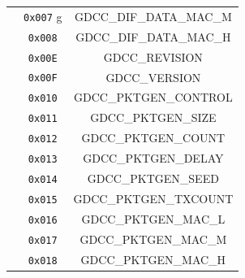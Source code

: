 \begin{table}[H]
\begin{tabular}{|c|c|c|}
                   & \texttt{0x007} g& GDCC\_DIF\_DATA\_MAC\_M \\
                   & \texttt{0x008} & GDCC\_DIF\_DATA\_MAC\_H \\
                   & \texttt{0x00E} & GDCC\_REVISION \\
                   & \texttt{0x00F} & GDCC\_VERSION \\
                   & \texttt{0x010} & GDCC\_PKTGEN\_CONTROL \\
                   & \texttt{0x011} & GDCC\_PKTGEN\_SIZE \\
                   & \texttt{0x012} & GDCC\_PKTGEN\_COUNT \\
                   & \texttt{0x013} & GDCC\_PKTGEN\_DELAY \\
                   & \texttt{0x014} & GDCC\_PKTGEN\_SEED \\
                   & \texttt{0x015} & GDCC\_PKTGEN\_TXCOUNT \\
                   & \texttt{0x016} & GDCC\_PKTGEN\_MAC\_L \\
                   & \texttt{0x017} &  GDCC\_PKTGEN\_MAC\_M \\
                   & \texttt{0x018} & GDCC\_PKTGEN\_MAC\_H \\
    \hline
  \end{tabular}
  \egroup
\end{table}
\printbibliography


